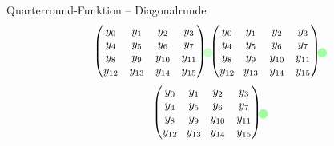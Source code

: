 \documentclass{beamer}
\newcommand{\tikzmark}[2]{
    \tikz[overlay,remember picture,baseline]
    \node[anchor=base] (#1){$#2$};
}
\begin{document}
\begin{frame}{Quarterround-Funktion -- Diagonalrunde}
\begin{equation*}
\begin{pmatrix}
\tikzmark{0}{y_0} & y_1 & y_2 & y_3 \\
y_4 &y_5 & y_6 & y_7 \\
y_8 & y_9 & y_{10} & y_{11} \\
y_{12} & y_{13} & y_{14} & \tikzmark{15}{y_{15}} \\
\end{pmatrix}
\begin{tikzpicture}[overlay,remember picture]
     \draw[opacity=.2,line width=3mm,line cap=round,color=green] (0.center) -- (15.center);
\end{tikzpicture}
\begin{pmatrix}
\hspace{0.2em}y_0 & \tikzmark{1}{y_1} & y_2 & y_3 \\
\hspace{0.2em}y_4 &y_5 & y_6 & y_7 \\
\hspace{0.2em}y_8 & y_9 & y_{10} & \tikzmark{11}{y_{11}} \\
\hspace{0.2em}\tikzmark{12}{y_{12}} & y_{13} & y_{14} & y_{15} \\
\end{pmatrix}
\begin{tikzpicture}[overlay,remember picture]
     \draw[opacity=.2,line width=3mm,line cap=round,color=green] (1.center) -- (11.center);
     \draw[opacity=.2,line width=3mm,line cap=round,color=green] (12.center) -- (12.center);
\end{tikzpicture}
\end{equation*}
\begin{equation*}
\begin{pmatrix}
y_0 & y_1 & \tikzmark{2}{y_2} & y_3 \\
y_4 &y_5 & y_6 & \tikzmark{7}{y_7} \\
\tikzmark{8}{y_8} & y_9 & y_{10} & y_{11} \\
y_{12} & \tikzmark{13}{y_{13}} & y_{14} & y_{15} \\
\end{pmatrix}
\begin{tikzpicture}[overlay,remember picture]
     \draw[opacity=.2,line width=3mm,line cap=round,color=green] (2.center) -- (7.center);
     \draw[opacity=.2,line width=3mm,line cap=round,color=green] (8.center) -- (13.center);

\end{tikzpicture}
\end{equation*}
\end{frame}
\end{document}
